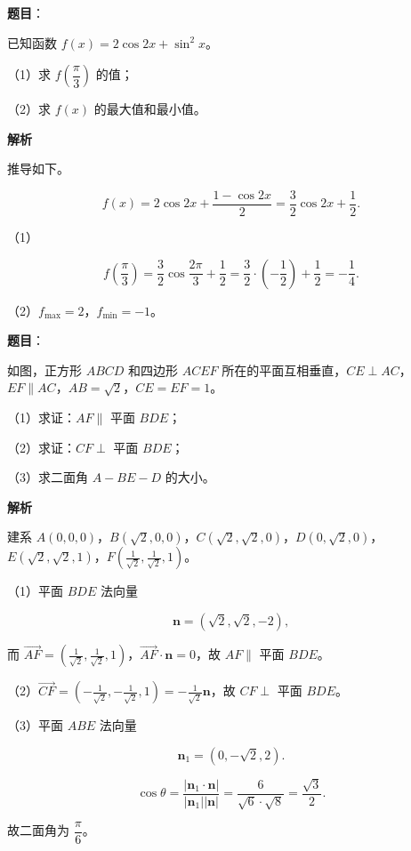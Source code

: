 \begin{answer}

\textbf{题目}：

已知函数 $f(x)=2\cos2x+\sin^2x$。

（1）求 $f\left(\dfrac\pi3\right)$ 的值；

（2）求 $f(x)$ 的最大值和最小值。

\textbf{解析}

推导如下。

\nopagebreak[4]
\[f(x)=2\cos2x+\frac{1-\cos2x}2=\frac32\cos2x+\frac12.\]

（1）

\nopagebreak[4]
\[f\left(\frac\pi3\right)=\frac32\cos\frac{2\pi}3+\frac12
=\frac32\cdot\left(-\frac12\right)+\frac12=-\frac14.\]

（2）$f_{\max}=2$，$f_{\min}=-1$。


\end{answer}
\begin{answer}

\textbf{题目}：

如图，正方形 $ABCD$ 和四边形 $ACEF$ 所在的平面互相垂直，$CE\perp AC$，$EF\parallel AC$，$AB=\sqrt2$，$CE=EF=1$。

（1）求证：$AF\parallel$ 平面 $BDE$；

（2）求证：$CF\perp$ 平面 $BDE$；

（3）求二面角 $A-BE-D$ 的大小。
\nopagebreak[4]
\begin{center}\end{center}
\nopagebreak[4]
\textbf{解析}

建系 $A(0,0,0)$，$B(\sqrt2,0,0)$，$C(\sqrt2,\sqrt2,0)$，$D(0,\sqrt2,0)$，$E(\sqrt2,\sqrt2,1)$，$F\left(\frac1{\sqrt2},\frac1{\sqrt2},1\right)$。

（1）平面 $BDE$ 法向量

\nopagebreak[4]
\[\boldsymbol n=(\sqrt2,\sqrt2,-2),\]

而 $\overrightarrow{AF}=\left(\frac1{\sqrt2},\frac1{\sqrt2},1\right)$，$\overrightarrow{AF}\cdot\boldsymbol n=0$，故 $AF\parallel$ 平面 $BDE$。

（2）$\overrightarrow{CF}=\left(-\frac1{\sqrt2},-\frac1{\sqrt2},1\right)=-\frac1{\sqrt2}\boldsymbol n$，故 $CF\perp$ 平面 $BDE$。

（3）平面 $ABE$ 法向量

\nopagebreak[4]
\[\boldsymbol n_1=(0,-\sqrt2,2).\]

\nopagebreak[4]
\[\cos\theta=\frac{|\boldsymbol n_1\cdot\boldsymbol n|}{|\boldsymbol n_1||\boldsymbol n|}
=\frac6{\sqrt6\cdot\sqrt8}=\frac{\sqrt3}2.\]

故二面角为 $\dfrac\pi6$。


\end{answer}
